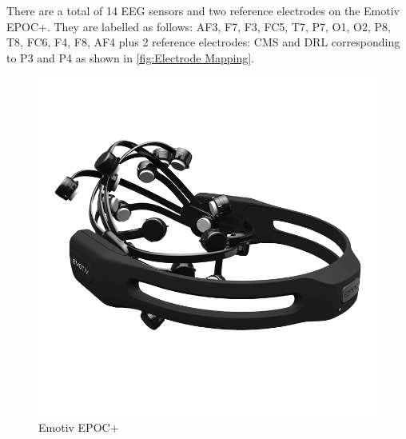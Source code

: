 \documentclass{article}
\begin{document}
There are a total of 14 EEG sensors and two reference electrodes on the Emotiv EPOC+. They are labelled as follows: AF3, F7, F3, FC5, T7, P7, O1, O2, P8, T8, FC6, F4, F8, AF4 plus 2 reference electrodes: CMS and DRL corresponding to P3 and P4 as shown in \ref{fig:Electrode Mapping}.

\begin{figure}[tbp]
    \centering
    \includegraphics[scale = 0.25]{Images/Epoc-product-image.png}
    \caption{Emotiv EPOC+}
    \label{fig:EPOC}
\end{figure}
\end{document}
